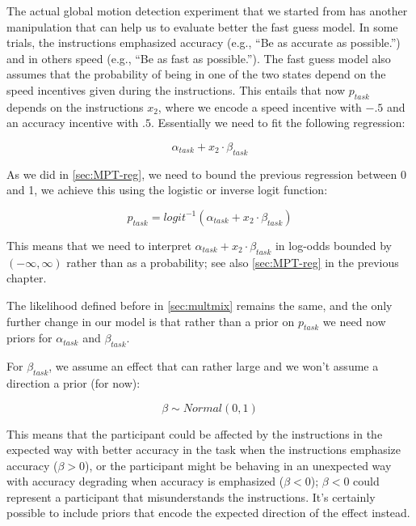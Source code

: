 \documentclass[12pt,]{krantz}
\theoremstyle{definition}
\theoremstyle{definition}
\theoremstyle{definition}
\theoremstyle{remark}
\begin{document}
The actual global motion detection experiment that we started from has another manipulation that can help us to evaluate better the fast guess model. In some trials, the instructions emphasized accuracy (e.g., ``Be as accurate as possible.'') and in others speed (e.g., ``Be as fast as possible.''). The fast guess model also assumes that the probability of being in one of the two states depend on the speed incentives given during the instructions. This entails that now \(p_{task}\) depends on the instructions \(x_2\), where we encode a speed incentive with \(-.5\) and an accuracy incentive with \(.5\). Essentially we need to fit the following regression:

\begin{equation}
\alpha_{task} + x_2 \cdot \beta_{task}
\end{equation}

As we did in \ref{sec:MPT-reg}, we need to bound the previous regression between 0 and 1, we achieve this using the logistic or inverse logit function:

\begin{equation}
p_{task} = logit^{-1}(\alpha_{task} + x_2 \cdot \beta_{task})
\end{equation}

This means that we need to interpret \(\alpha_{task} + x_2 \cdot \beta_{task}\) in log-odds bounded by \((-\infty, \infty)\) rather than as a probability; see also \ref{sec:MPT-reg} in the previous chapter.

The likelihood defined before in \ref{sec:multmix} remains the same, and the only further change in our model is that rather than a prior on \(p_{task}\) we need now priors for \(\alpha_{task}\) and \(\beta_{task}\).

For \(\beta_{task}\), we assume an effect that can rather large and we won't assume a direction a prior (for now):

\begin{equation}
\beta \sim Normal(0, 1)
\end{equation}

This means that the participant could be affected by the instructions in the expected way with better accuracy in the task when the instructions emphasize accuracy (\(\beta >0\)), or the participant might be behaving in an unexpected way with accuracy degrading when accuracy is emphasized (\(\beta <0\)); \(\beta <0\) could represent a participant that misunderstands the instructions. It's certainly possible to include priors that encode the expected direction of the effect instead.
\end{document}
